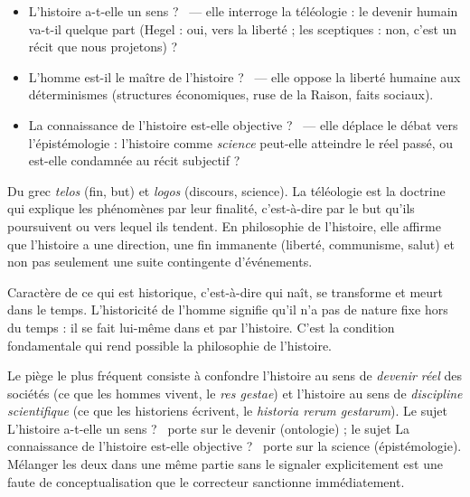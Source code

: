 \documentclass[11pt]{article}
\newcommand{\cle}[1]{{\popxbold\color{popdark}#1}}
\begin{document}
\begin{itemize}
\item \guillemotleft L'histoire a-t-elle un sens ? \guillemotright\ — elle interroge la \cle{téléologie} : le devenir humain va-t-il quelque part (Hegel : oui, vers la liberté ; les sceptiques : non, c'est un récit que nous projetons) ?
\item \guillemotleft L'homme est-il le maître de l'histoire ? \guillemotright\ — elle oppose la \cle{liberté} humaine aux déterminismes (structures économiques, ruse de la Raison, faits sociaux).
\item \guillemotleft La connaissance de l'histoire est-elle objective ? \guillemotright\ — elle déplace le débat vers l'épistémologie : l'histoire comme \emph{science} peut-elle atteindre le réel passé, ou est-elle condamnée au récit subjectif ?
\end{itemize}

\begin{definition}[Téléologie]
Du grec \emph{telos} (fin, but) et \emph{logos} (discours, science). La téléologie est la doctrine qui explique les phénomènes par leur finalité, c'est-à-dire par le but qu'ils poursuivent ou vers lequel ils tendent. En philosophie de l'histoire, elle affirme que l'histoire a une direction, une fin immanente (liberté, communisme, salut) et non pas seulement une suite contingente d'événements.
\end{definition}

\begin{definition}[Historicité]
Caractère de ce qui est historique, c'est-à-dire qui naît, se transforme et meurt dans le temps. L'\cle{historicité} de l'homme signifie qu'il n'a pas de nature fixe hors du temps : il se fait lui-même dans et par l'histoire. C'est la condition fondamentale qui rend possible la philosophie de l'histoire.
\end{definition}

\begin{attention}
Le piège le plus fréquent consiste à confondre l'\cle{histoire} au sens de \emph{devenir réel} des sociétés (ce que les hommes vivent, le \emph{res gestae}) et l'histoire au sens de \emph{discipline scientifique} (ce que les historiens écrivent, le \emph{historia rerum gestarum}). Le sujet \guillemotleft L'histoire a-t-elle un sens ? \guillemotright\ porte sur le devenir (ontologie) ; le sujet \guillemotleft La connaissance de l'histoire est-elle objective ? \guillemotright\ porte sur la science (épistémologie). Mélanger les deux dans une même partie sans le signaler explicitement est une faute de conceptualisation que le correcteur sanctionne immédiatement.
\end{attention}
\end{document}
